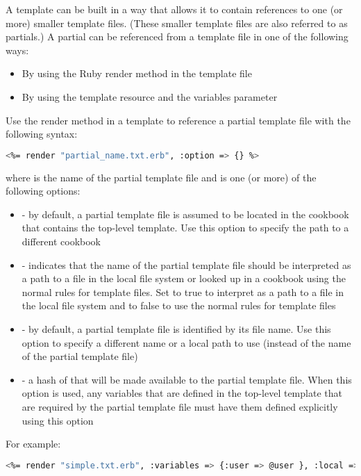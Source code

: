 A template can be built in a way that allows it to contain references to one (or more) smaller template files. (These smaller template files are also referred to as partials.) A partial can be referenced from a template file in one of the following ways:

\begin{itemize}
  \item By using the Ruby render method in the template file
  \item By using the template resource and the variables parameter
\end{itemize}

Use the render method in a template to reference a partial template file with the following syntax:

\begin{lstlisting}[language=Bash,label=lst:cookbook-templates10]
<%= render "partial_name.txt.erb", :option => {} %>
\end{lstlisting}

where  is the name of the partial template file and  is one (or more) of the following options:

\begin{itemize}
  \item {} - by default, a partial template file is assumed to be located in the cookbook that contains the top-level template. Use this option to specify the path to a different cookbook
  \item {} - indicates that the name of the partial template file should be interpreted as a path to a file in the local file system or looked up in a cookbook using the normal rules for template files. Set to true to interpret as a path to a file in the local file system and to false to use the normal rules for template files
  \item {} - by default, a partial template file is identified by its file name. Use this option to specify a different name or a local path to use (instead of the name of the partial template file)
  \item {} - a hash of  that will be made available to the partial template file. When this option is used, any variables that are defined in the top-level template that are required by the partial template file must have them defined explicitly using this option
\end{itemize}

For example:

\begin{lstlisting}[language=Bash,label=lst:cookbook-templates11]
<%= render "simple.txt.erb", :variables => {:user => @user }, :local => true %>
\end{lstlisting}


